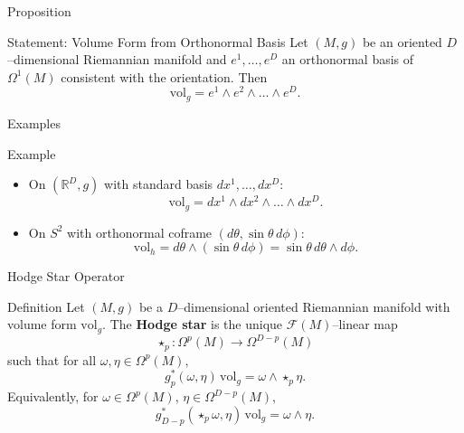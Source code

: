 \begin{frame}{Proposition}
\begin{block}{Statement: Volume Form from Orthonormal Basis}
Let $(M,g)$ be an oriented $D$–dimensional Riemannian manifold and
$e^1,\dots,e^D$ an orthonormal basis of $\Omega^1(M)$ consistent with the orientation.
Then
\[
\mathrm{vol}_g=e^1\wedge e^2\wedge\dots\wedge e^D.
\]
\end{block}
\end{frame}

\begin{frame}{Examples}
\vspace{-0.2cm}
    \begin{block}{Example}
\begin{itemize}
\item On $(\mathbb{R}^D,g)$ with standard basis $dx^1,\dots,dx^D$:
\vspace{-0.2cm}
\[
\mathrm{vol}_g=dx^1\wedge dx^2\wedge\dots\wedge dx^D.
\]
\item On $S^2$ with orthonormal coframe $(d\theta,\sin\theta\,d\phi)$:
\vspace{-0.2cm}
\[
\mathrm{vol}_h=d\theta\wedge(\sin\theta\,d\phi)=\sin\theta\,d\theta\wedge d\phi.
\]
\end{itemize}
\end{block}
\vspace{-0.2cm}
\begin{center}
\end{center}
\end{frame}

\begin{frame}{Hodge Star Operator}
\begin{block}{Definition}
Let $(M,g)$ be a $D$–dimensional oriented Riemannian manifold with volume form $\mathrm{vol}_g$.
The \textbf{Hodge star} is the unique $\mathcal{F}(M)$–linear map
\[
\star_p:\Omega^p(M)\to \Omega^{D-p}(M)
\]
such that for all $\omega,\eta\in\Omega^p(M)$,
\[
g^*_p(\omega,\eta)\,\mathrm{vol}_g=\omega\wedge\star_p\eta.
\]
Equivalently, for $\omega\in\Omega^p(M)$, $\eta\in\Omega^{D-p}(M)$,
\[
g^*_{D-p}(\star_p\omega,\eta)\,\mathrm{vol}_g=\omega\wedge\eta.
\]
\end{block}
\end{frame}

